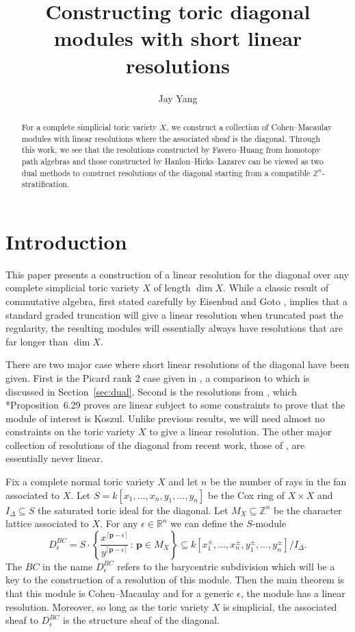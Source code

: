\documentclass{amsart}
\title{Constructing toric diagonal modules with short linear resolutions}
\author{Jay Yang}
\newcommand{\ZZ}{\mathbb{Z}}
\newcommand{\RR}{\mathbb{R}}
\newcommand{\field}{k}
\newcommand{\Mepsilon}{D^{BC}_{\epsilon}}
\theoremstyle{remark}
\newcommand{\set}[2]{\left\{#1\,:\,#2\right\}}
\begin{document}
\begin{abstract}
  For a complete simplicial toric variety $X$,
  we construct a collection of Cohen--Macaulay modules with linear resolutions
  where the associated sheaf is the diagonal.
  Through this work, we see that the resolutions constructed by Favero--Huang from homotopy path algebras
  and those constructed by Hanlon--Hicks--Lazarev can be viewed as two dual methods
  to construct resolutions of the diagonal starting from a compatible $\ZZ^n$-stratification.
\end{abstract}

\maketitle


\section{Introduction}

This paper presents a construction of a linear resolution for the diagonal over any complete simplicial toric variety $X$ of length $\dim X$. While a classic result of commutative algebra, first stated carefully by Eisenbud and Goto \cite{eisenbud-goto}, implies that a standard graded truncation will give a linear resolution when truncated past the regularity, the resulting modules will essentially always have resolutions that are far longer than $\dim X$. 

There are two major case where short linear resolutions of the diagonal have been given. First is the Picard rank 2 case given in \cite{brown-sayrafi}, a comparison to which is discussed in Section~\ref{sec:dual}. Second is the resolutions from \cite{FH25}, which \cite{FH25}*{Proposition~6.29} proves are linear subject to some constraints to prove that the module of interest is Koszul. Unlike previous results, we will need almost no constraints on the toric variety $X$ to give a linear resolution.
The other major collection of resolutions of the diagonal from recent work, those of \cite{HHL24}, are essentially never linear.

Fix a complete normal toric variety $X$ and let $n$ be the number of rays in the fan associated to $X$.
Let $S=\field[x_1,\ldots,x_n,y_1,\ldots,y_n]$ be the Cox ring of $X\times X$ and $I_\Delta\subseteq S$ the saturated toric ideal for the diagonal.
Let $M_X\subseteq \ZZ^n$ be the character lattice associated to $X$.
For any $\epsilon\in \RR^n$ we can define the $S$-module
\[\Mepsilon = S\cdot \set{\frac{x^{\lceil \bm{p}-\epsilon\rceil}}{y^{\lceil \bm{p}-\epsilon\rceil}}}{\bm{p}\in M_X}\subseteq
\field[x_1^{\pm},\ldots,x_n^{\pm},y_1^{\pm},\ldots,y_n^{\pm}]/I_\Delta.\]
The $BC$ in the name $D^{BC}_\epsilon$ refers to the barycentric subdivision which will be a key to the construction of a resolution of this module.
Then the main theorem is that this module is Cohen--Macaulay and for a generic $\epsilon$, the module has a linear resolution. Moreover, so long as the toric variety $X$ is simplicial, the associated sheaf to $\Mepsilon$ is the structure sheaf of the diagonal.
\end{document}
